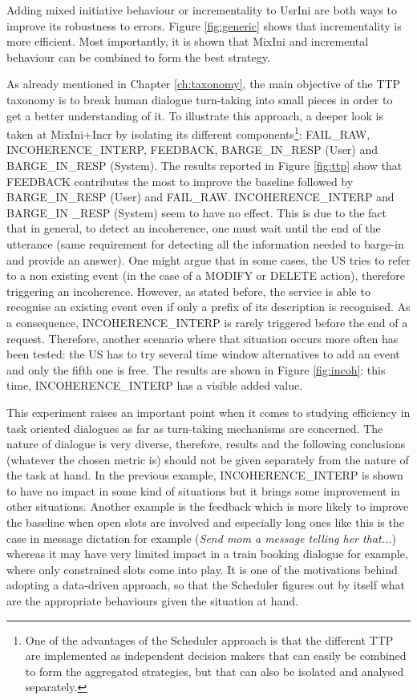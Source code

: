      	Adding mixed initiative behaviour or incrementality to UsrIni are both ways to improve its robustness to errors. Figure \ref{fig:generic} shows that incrementality is more efficient. Most importantly, it is shown that MixIni and incremental behaviour can be combined to form the best strategy.
    
    	As already mentioned in Chapter \ref{ch:taxonomy}, the main objective of the TTP taxonomy is to break human dialogue turn-taking into small pieces in order to get a better understanding of it. To illustrate this approach, a deeper look is taken at MixIni+Incr by isolating its different components\footnote{One of the advantages of the Scheduler approach is that the different TTP are implemented as independent decision makers that can easily be combined to form the aggregated strategies, but that can also be isolated and analysed separately.}: FAIL\_RAW, INCOHERENCE\_INTERP, FEEDBACK, BARGE\_IN\_RESP (User) and BARGE\_IN\_RESP (System). The results reported in Figure \ref{fig:ttp} show that FEEDBACK contributes the most to improve the baseline followed by BARGE\_IN\_RESP (User) and FAIL\_RAW. INCOHERENCE\_INTERP and BARGE\_IN \_RESP (System) seem to have no effect. This is due to the fact that in general, to detect an incoherence, one must wait until the end of the utterance (same requirement for detecting all the information needed to barge-in and provide an answer). One might argue that in some cases, the US tries to refer to a non existing event (in the case of a MODIFY or DELETE action), therefore triggering an incoherence. However, as stated before, the service is able to recognise an existing event even if only a prefix of its description is recognised. As a consequence, INCOHERENCE\_INTERP is rarely triggered before the end of a request. Therefore, another scenario where that situation occurs more often has been tested: the US has to try several time window alternatives to add an event and only the fifth one is free. The results are shown in Figure \ref{fig:incoh}: this time, INCOHERENCE\_INTERP has a visible added value.
				
				 This experiment raises an important point when it comes to studying efficiency in task oriented dialogues as far as turn-taking mechanisms are concerned. The nature of dialogue is very diverse, therefore, results and the following conclusions (whatever the chosen metric is) should not be given separately from the nature of the task at hand. In the previous example, INCOHERENCE\_INTERP is shown to have no impact in some kind of situations but it brings some improvement in other situations. Another example is the feedback which is more likely to improve the baseline when open slots are involved and especially long ones like this is the case in message dictation for example (\textit{Send mom a message telling her that...}) whereas it may have very limited impact in a train booking dialogue for example, where only constrained slots come into play. It is one of the motivations behind adopting a data-driven approach, so that the Scheduler figures out by itself what are the appropriate behaviours given the situation at hand.

